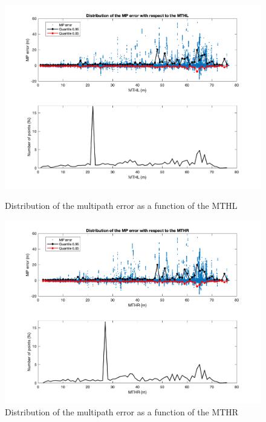 \documentclass[a4paper, report, oneside, UKenglish]{memoir}
\begin{document}
\begin{figure}[ht]
  \centering
  \begin{minipage}[b]{0.49\textwidth}
    \includegraphics[width=\textwidth]{data-analysis/mpn_maxtopol.png}
    \caption{Distribution of the multipath error as a function of the MTHL}
    \label{fig:mpn_mthl}
  \end{minipage}
  \hfill
  \begin{minipage}[b]{0.49\textwidth}
    \includegraphics[width=\textwidth]{data-analysis/mpn_maxtopor.png}
    \caption{Distribution of the multipath error as a function of the MTHR}
    \label{fig:mpn_mthr}
  \end{minipage}
\end{figure}
\end{document}
